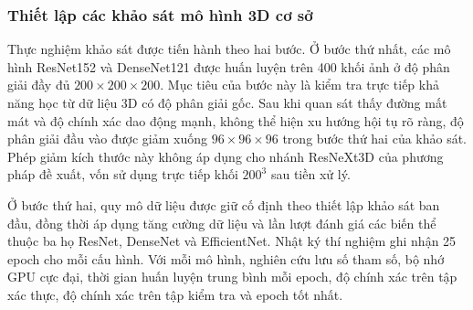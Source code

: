 \documentclass[14pt,a4paper,oneside]{extreport}
\begin{document}
\subsubsection{Thiết lập các khảo sát mô hình 3D cơ sở}
Thực nghiệm khảo sát được tiến hành theo hai bước. Ở bước thứ nhất, các mô hình
ResNet152 và DenseNet121 được huấn luyện trên 400 khối ảnh ở độ phân giải đầy đủ
$200\times200\times200$. Mục tiêu của bước này là kiểm tra trực tiếp khả năng
học từ dữ liệu 3D có độ phân giải gốc. Sau khi quan sát thấy đường mất mát và độ
chính xác dao động mạnh, không thể hiện xu hướng hội tụ rõ ràng, độ phân giải đầu
vào được giảm xuống $96\times96\times96$ trong bước thứ hai của khảo sát.
Phép giảm kích thước này không áp dụng cho nhánh ResNeXt3D của phương
pháp đề xuất, vốn sử dụng trực tiếp khối $200^3$ sau tiền xử lý.

Ở bước thứ hai, quy mô dữ liệu được giữ cố định theo thiết lập khảo sát ban đầu,
đồng thời áp dụng tăng cường dữ liệu và lần lượt đánh giá các biến thể thuộc ba
họ ResNet, DenseNet và EfficientNet. Nhật ký thí nghiệm ghi nhận 25 epoch cho
mỗi cấu hình. Với mỗi mô hình, nghiên cứu lưu số tham số, bộ nhớ GPU cực đại,
thời gian huấn luyện trung bình mỗi epoch, độ chính xác trên tập xác thực, độ
chính xác trên tập kiểm tra và epoch tốt nhất.

%
%
\end{document}
